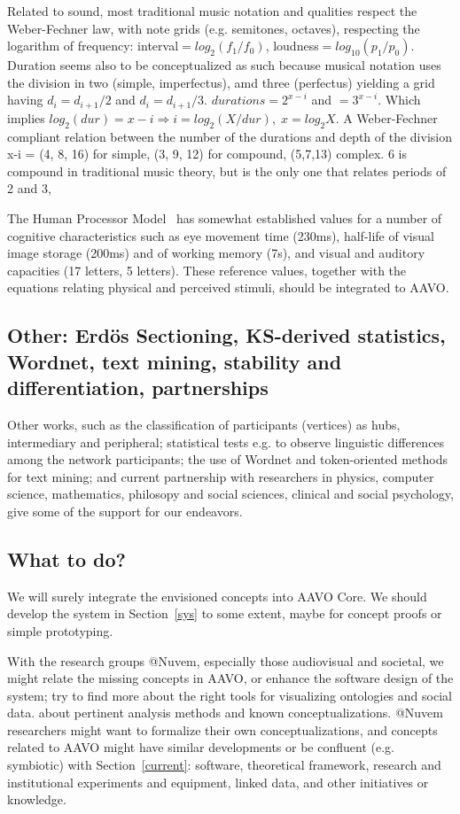 \documentclass[letterpaper,10pt]{article}
\begin{document}
Related to sound, most traditional music notation and qualities
respect the Weber-Fechner law, with note grids (e.g. semitones, octaves),
respecting the logarithm of frequency: interval$=log_2(f_1/f_0)$,
loudness$=log_{10}(p_1/p_0)$.
Duration seems also to be conceptualized as such
because musical notation uses the division in two (simple, imperfectus),
amd three (perfectus) yielding a grid having
$d_i=d_{i+1}/2$ and $d_i=d_{i+1}/3$.
$durations=2^{x-i}$ and $=3^{x-i}$.
Which implies $log_2(dur) = x-i \Rightarrow i = log_2(X/dur),\;x = log_2X$.
A Weber-Fechner compliant relation
between the number of the durations and
depth of the division x-i = (4, 8, 16) for simple,
(3, 9, 12) for compound,
(5,7,13) complex.
6 is compound in traditional music theory,
but is the only one that relates periods of 2 and 3,

The Human Processor Model~\cite{HPM}
has somewhat established values for
a number of cognitive characteristics such as eye movement time (230ms),
half-life of visual image storage (200ms) and 
of
working memory (7s),
and visual and auditory capacities (17 letters, 5 letters).
These reference values, together with the
equations relating physical and perceived stimuli,
should be integrated to AAVO.

\subsection{Other: Erdös Sectioning, KS-derived statistics, Wordnet,
text mining, stability and differentiation, partnerships}
Other works, such as the classification of participants (vertices) as
hubs, intermediary and peripheral; statistical tests e.g. to
observe linguistic differences among the network participants;
the use of Wordnet and token-oriented methods for text mining;
and current partnership with researchers in physics, computer science,
mathematics, philosopy and social sciences, clinical and social psychology,
give some of the support for our endeavors.~\cite{tese}

\subsection{What to do?}
We will surely integrate the envisioned concepts into AAVO Core.
We should develop the system in Section~\ref{sys} to some extent,
maybe for concept proofs or simple prototyping.

With the research groups @Nuvem, 
especially those audiovisual and societal,
we might relate the missing concepts in AAVO,
or enhance the software design of the system;
try to find more about the right tools for visualizing
ontologies and social data.
about pertinent analysis methods
and known conceptualizations.
@Nuvem researchers might want to formalize their own conceptualizations,
and concepts related to AAVO might have similar developments
or be confluent (e.g. symbiotic)
with Section~\ref{current}: software,
theoretical framework, research and institutional experiments and equipment,
linked data, and other initiatives or knowledge.
\end{document}
